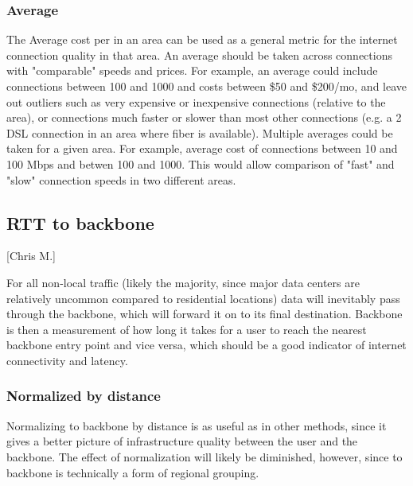 
\subsubsection{Average}
The Average cost per \mbps in an area can be used as a general metric for the internet connection quality in that area. An average should be taken across connections with "comparable" speeds and prices. For example, an average could include connections between 100 and 1000 \mbps and costs between \$50 and \$200/mo, and leave out outliers such as very expensive or inexpensive connections (relative to the area), or connections much faster or slower than most other connections (e.g. a 2 \mbps DSL connection in an area where fiber is available). Multiple averages could be taken for a given area. For example, average cost of connections between 10 and 100 Mbps and betwen 100 and 1000. This would allow comparison of "fast" and "slow" connection speeds in two different areas.


\subsection{RTT to backbone}[Chris M.]

For all non-local traffic (likely the majority, since major data centers are relatively uncommon compared to residential locations) data will inevitably pass through the \gls{backbone}, which will forward it on to its final destination. Backbone \rtt is then a measurement of how long it takes for a user to reach the nearest backbone entry point and vice versa, which should be a good indicator of internet connectivity and latency.

\subsubsection{Normalized by distance}

Normalizing \rtt to \gls{backbone} by distance is as useful as in other \rtt methods, since it gives a better picture of infrastructure quality between the user and the backbone. The effect of normalization will likely be diminished, however, since \rtt to backbone is technically a form of regional grouping.

